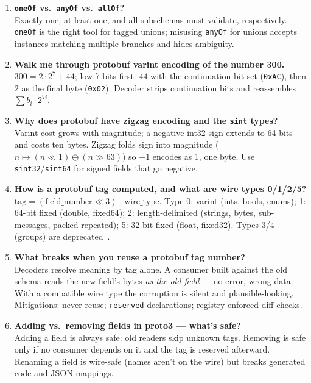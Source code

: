 \begin{enumerate}[label=\textbf{Q\arabic*.}, leftmargin=1.3cm, itemsep=0.8em]
\item \textbf{\texttt{oneOf} vs.\ \texttt{anyOf} vs.\ \texttt{allOf}?}\\
Exactly one, at least one, and all subschemas must validate, respectively.
\texttt{oneOf} is the right tool for tagged unions; misusing \texttt{anyOf} for
unions accepts instances matching multiple branches and hides ambiguity.

\item \textbf{Walk me through protobuf varint encoding of the number 300.}\\
$300 = 2 \cdot 2^7 + 44$; low 7 bits first: $44$ with the continuation bit set
(\texttt{0xAC}), then $2$ as the final byte (\texttt{0x02}). Decoder strips
continuation bits and reassembles $\sum b_i \cdot 2^{7i}$.

\item \textbf{Why does protobuf have zigzag encoding and the \texttt{sint} types?}\\
Varint cost grows with magnitude; a negative int32 sign-extends to 64 bits and
costs ten bytes. Zigzag folds sign into magnitude
($n \mapsto (n \ll 1) \oplus (n \gg 63)$) so $-1$ encodes as 1, one byte. Use
\texttt{sint32}/\texttt{sint64} for signed fields that go negative.

\item \textbf{How is a protobuf tag computed, and what are wire types 0/1/2/5?}\\
$\text{tag} = (\text{field\_number} \ll 3) \mathbin{|} \text{wire\_type}$. Type 0:
varint (ints, bools, enums); 1: 64-bit fixed (double, fixed64); 2:
length-delimited (strings, bytes, sub-messages, packed repeated); 5: 32-bit fixed
(float, fixed32). Types 3/4 (groups) are deprecated~\cite{protobufdocs}.

\item \textbf{What breaks when you reuse a protobuf tag number?}\\
Decoders resolve meaning by tag alone. A consumer built against the old schema
reads the new field's bytes \emph{as the old field} --- no error, wrong data. With
a compatible wire type the corruption is silent and plausible-looking. Mitigations:
never reuse; \texttt{reserved} declarations; registry-enforced diff checks.

\item \textbf{Adding vs.\ removing fields in proto3 --- what's safe?}\\
Adding a field is always safe: old readers skip unknown tags. Removing is safe
only if no consumer depends on it and the tag is reserved afterward. Renaming a
field is wire-safe (names aren't on the wire) but breaks generated code and JSON
mappings.


\end{enumerate}
